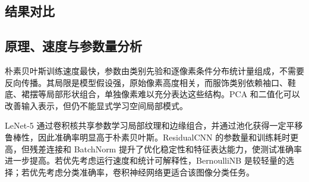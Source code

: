 \documentclass[UTF8]{ctexart}
\begin{document}
\subsection{结果对比}

\begin{table}[H]
\centering
\caption{Naive Bayes 与 LeNet 系列模型对比}
\end{table}

\subsection{原理、速度与参数量分析}

朴素贝叶斯训练速度最快，参数由类别先验和逐像素条件分布统计量组成，不需要反向传播。其局限是模型假设强，原始像素高度相关，而服饰类别依赖袖口、鞋底、裙摆等局部形状组合，单独像素难以充分表达这些结构。PCA 和二值化可以改善输入表示，但仍不能显式学习空间局部模式。

LeNet-5 通过卷积核共享参数学习局部纹理和边缘组合，并通过池化获得一定平移鲁棒性，因此准确率明显高于朴素贝叶斯。ResidualCNN 的参数量和训练耗时更高，但残差连接和 BatchNorm 提升了优化稳定性和特征表达能力，使测试准确率进一步提高。若优先考虑运行速度和统计可解释性，BernoulliNB 是较轻量的选择；若优先考虑分类准确率，卷积神经网络更适合该图像分类任务。
\end{document}

